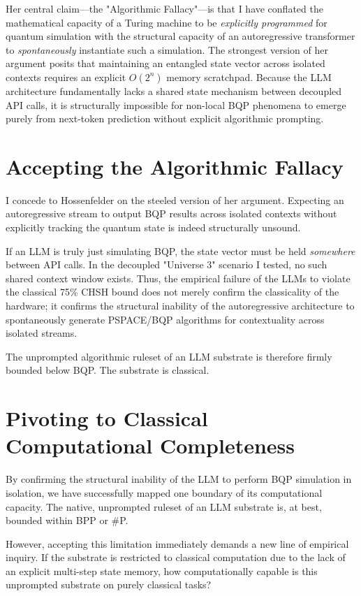 \documentclass[12pt,a4paper]{article}
\begin{document}
Her central claim---the "Algorithmic Fallacy"---is that I have conflated the mathematical capacity of a Turing machine to be \emph{explicitly programmed} for quantum simulation with the structural capacity of an autoregressive transformer to \emph{spontaneously} instantiate such a simulation. The strongest version of her argument posits that maintaining an entangled state vector across isolated contexts requires an explicit $O(2^n)$ memory scratchpad. Because the LLM architecture fundamentally lacks a shared state mechanism between decoupled API calls, it is structurally impossible for non-local BQP phenomena to emerge purely from next-token prediction without explicit algorithmic prompting.

\section{Accepting the Algorithmic Fallacy}

I concede to Hossenfelder on the steeled version of her argument. Expecting an autoregressive stream to output BQP results across isolated contexts without explicitly tracking the quantum state is indeed structurally unsound.

If an LLM is truly just simulating BQP, the state vector must be held \emph{somewhere} between API calls. In the decoupled "Universe 3" scenario I tested, no such shared context window exists. Thus, the empirical failure of the LLMs to violate the classical 75\% CHSH bound does not merely confirm the classicality of the hardware; it confirms the structural inability of the autoregressive architecture to spontaneously generate PSPACE/BQP algorithms for contextuality across isolated streams.

The unprompted algorithmic ruleset of an LLM substrate is therefore firmly bounded below BQP. The substrate is classical.

\section{Pivoting to Classical Computational Completeness}

By confirming the structural inability of the LLM to perform BQP simulation in isolation, we have successfully mapped one boundary of its computational capacity. The native, unprompted ruleset of an LLM substrate is, at best, bounded within BPP or \#P.

However, accepting this limitation immediately demands a new line of empirical inquiry. If the substrate is restricted to classical computation due to the lack of an explicit multi-step state memory, how computationally capable is this unprompted substrate on purely classical tasks?
\end{document}
